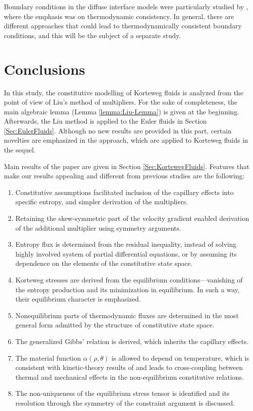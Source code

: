 \documentclass[a4paper,fleqn]{cas-sc}
\theoremstyle{definition}
\begin{document}
Boundary conditions in the diffuse interface models were particularly studied by \cite{heida2013derivation,heida2014thermodynamics}, where the emphasis was on thermodynamic consistency. In general, there are different approaches that could lead to thermodynamically consistent boundary conditions, and this will be the subject of a separate study. 


\section{Conclusions} \label{Sec:Conclusions} 


In this study, the constitutive modelling of Korteweg fluids is analyzed from the point of view of Liu's method of multipliers. For the sake of completeness, the main algebraic lemma (Lemma \ref{lemma:Liu-Lemma}) is given at the beginning. Afterwards, the Liu method is applied to the Euler fluids in Section \ref{Sec:EulerFluids}. Although no new results are provided in this part, certain novelties are emphasized in the approach, which are applied to Korteweg fluids in the sequel. 

Main results of the paper are given in Section \ref{Sec:KortewegFluids}. Features that make our results appealing and different from previous studies are the following: 
\begin{enumerate}
	\item Constitutive assumptions facilitated inclusion of the capillary effects into specific entropy, and simpler derivation of the multipliers. 
	\item Retaining the skew-symmetric part of the velocity gradient enabled derivation of the additional multiplier using symmetry arguments. 
	\item Entropy flux is determined from the residual inequality, instead of solving highly involved system of partial differential equations, or by assuming its dependence on the elements of the constitutive state space. 
	\item Korteweg stresses are derived from the equilibrium conditions---vanishing of the entropy production and its minimization in equilibrium. In such a way, their equilibrium character is emphasized. 
	\item Nonequilibrium parts of thermodynamic fluxes are determined in the most general form admitted by the structure of constitutive state space. 
	\item The generalized Gibbs' relation is derived, which inherits the capillary effects. 
	\item The material function $\alpha(\rho,\theta)$ is allowed to depend on temperature, which is consistent with kinetic-theory results of \cite{bhattacharjee2024temperature} and leads to cross-coupling between thermal and mechanical effects in the non-equilibrium constitutive relations.
	\item The non-uniqueness of the equilibrium stress tensor is identified and its resolution through the symmetry of the constraint argument is discussed.
\end{enumerate}
\end{document}
